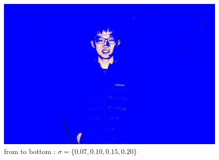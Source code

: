 \documentclass[final]{cvpr}
\begin{document}
\begin{figure}[ht]
   \includegraphics[scale=0.03]{../data/output/arthas_final_f_1.2_0.20_10_10.JPG}
   \caption{from to bottom : $ \sigma = \{0.07,0.10,0.15,0.20\}$}
\end{figure}
\end{document}
